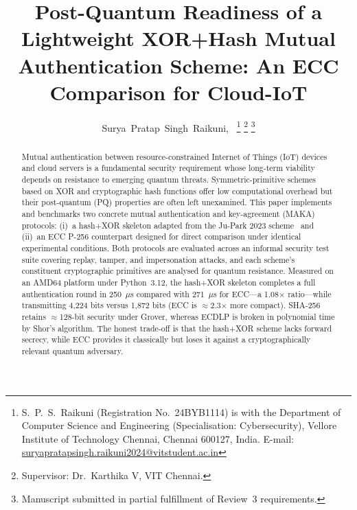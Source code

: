 \documentclass[journal]{IEEEtran}
\begin{document}
\title{Post-Quantum Readiness of a Lightweight XOR+Hash Mutual Authentication
Scheme: An ECC Comparison for Cloud-IoT}

\author{Surya~Pratap~Singh~Raikuni,~
\thanks{S.~P.~S.~Raikuni (Registration No.\ 24BYB1114) is with the
Department of Computer Science and Engineering (Specialisation:
Cybersecurity), Vellore Institute of Technology Chennai, Chennai 600127,
India. E-mail: \url{suryapratapsingh.raikuni2024@vitstudent.ac.in}}
\thanks{Supervisor: Dr.\ Karthika V, VIT Chennai.}
\thanks{Manuscript submitted in partial fulfillment of Review~3 requirements.}}

\maketitle

\begin{abstract}
Mutual authentication between resource-constrained Internet of Things (IoT)
devices and cloud servers is a fundamental security requirement whose
long-term viability depends on resistance to emerging quantum threats.
Symmetric-primitive schemes based on XOR and cryptographic hash functions
offer low computational overhead but their post-quantum (PQ) properties are
often left unexamined. This paper implements and benchmarks two concrete
mutual authentication and key-agreement (MAKA) protocols: (i)~a hash+XOR
skeleton adapted from the Ju-Park 2023 scheme~\cite{JuPark2023} and
(ii)~an ECC P-256 counterpart designed for direct comparison under identical
experimental conditions. Both protocols are evaluated across an informal
security test suite covering replay, tamper, and impersonation attacks, and
each scheme's constituent cryptographic primitives are analysed for quantum
resistance. Measured on an AMD64 platform under Python~3.12, the hash+XOR
skeleton completes a full authentication round in 250~$\mu$s compared with
271~$\mu$s for ECC---a 1.08$\times$ ratio---while transmitting 4,224 bits
versus 1,872 bits (ECC is $\approx$2.3$\times$ more compact). SHA-256
retains $\approx$128-bit security under Grover, whereas ECDLP is broken in
polynomial time by Shor's algorithm. The honest trade-off is that the
hash+XOR scheme lacks forward secrecy, while ECC provides it classically but
loses it against a cryptographically relevant quantum adversary.
\end{abstract}
\end{document}
